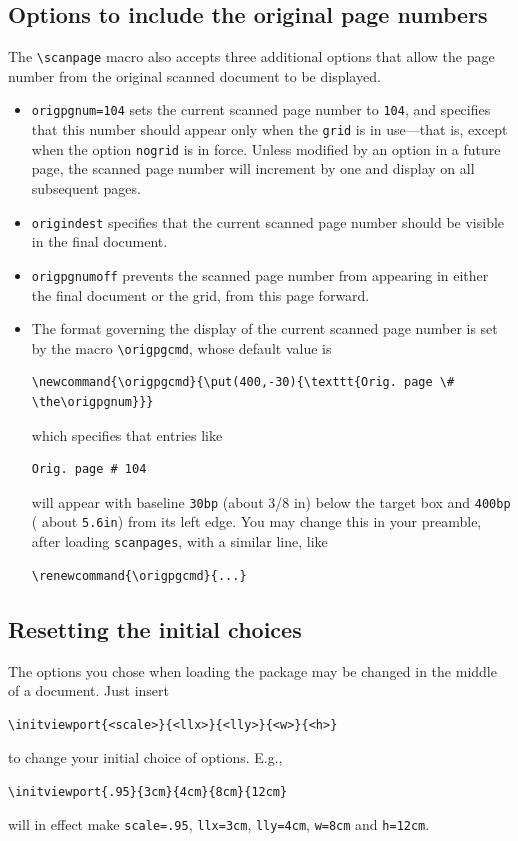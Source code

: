 \documentclass[11pt]{article}
\begin{document}
\subsection{Options to include the original page numbers}
The \verb|\scanpage| macro also accepts three additional options that allow the page number from the original scanned document to be displayed.
\begin{itemize}
\item
\verb|origpgnum=104| sets the current scanned page number to {\tt 104}, and specifies that this number should appear only when the {\tt grid} is in use---that is, except when the option {\tt nogrid} is in force. Unless modified by an option in a  future page, the scanned page number will increment by one and display on all subsequent pages.
\item \verb|origindest| specifies that the current scanned page number should be visible in the final document.
\item \verb|origpgnumoff| prevents the scanned page number from appearing in either the final document or the grid, from this page forward. 
\item
The format governing the display of the current scanned page number is set by the macro \verb|\origpgcmd|, whose default value is
\begin{verbatim}
\newcommand{\origpgcmd}{\put(400,-30){\texttt{Orig. page \# \the\origpgnum}}}
\end{verbatim}
which specifies that  entries like
\begin{verbatim}
Orig. page # 104
\end{verbatim}
will appear with baseline {\tt 30bp} (about 3/8 in) below the target box and {\tt 400bp} ( about {\tt5.6in}) from its left edge. You may change this in your preamble, after loading {\tt scanpages}, with a similar line, like
\begin{verbatim}
\renewcommand{\origpgcmd}{...}
\end{verbatim}


\end{itemize}


\subsection{Resetting the initial choices}
The options you chose when loading the package may be changed in the middle of a document. Just insert
\begin{verbatim}
\initviewport{<scale>}{<llx>}{<lly>}{<w>}{<h>}
\end{verbatim}
to change your initial choice of options. E.g.,
\begin{verbatim}
\initviewport{.95}{3cm}{4cm}{8cm}{12cm}
\end{verbatim}
will in effect make {\tt scale=.95}, {\tt llx=3cm}, {\tt lly=4cm}, {\tt w=8cm} and {\tt h=12cm}. 
\end{document}
